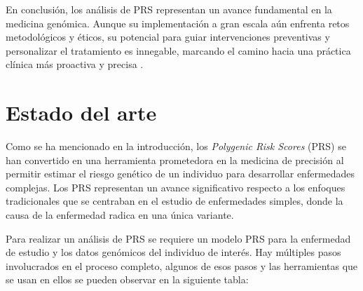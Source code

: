 En conclusión, los análisis de PRS representan un avance fundamental en la medicina genómica. Aunque su implementación a gran escala aún enfrenta retos metodológicos y éticos, su potencial para guiar intervenciones preventivas y personalizar el tratamiento es innegable, marcando el camino hacia una práctica clínica más proactiva y precisa \cite{wray}.


\section{Estado del arte}
Como se ha mencionado en la introducción, los \textit{Polygenic Risk Scores} (PRS) se han convertido en una herramienta prometedora en la medicina de precisión al permitir estimar el riesgo genético de un individuo para desarrollar enfermedades complejas. Los PRS representan un avance significativo respecto a los enfoques tradicionales que se centraban en el estudio de enfermedades simples, donde la causa de la enfermedad radica en una única variante.

Para realizar un análisis de PRS se requiere un modelo PRS para la enfermedad de estudio y los datos genómicos del individuo de interés. Hay múltiples pasos involucrados en el proceso completo, algunos de esos pasos y las herramientas que se usan en ellos se pueden observar en la siguiente tabla:

